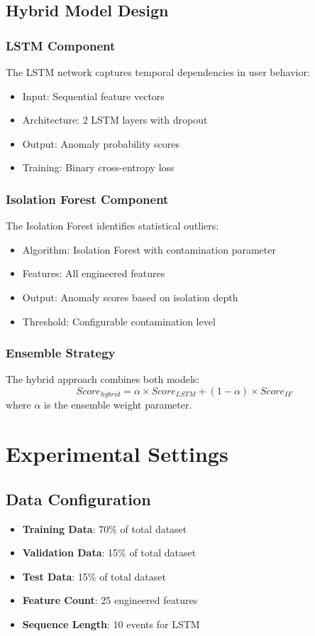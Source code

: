 \documentclass[conference]{IEEEtran}
\begin{document}
\subsection{Hybrid Model Design}
\subsubsection{LSTM Component}
The LSTM network captures temporal dependencies in user behavior:
\begin{itemize}
    \item Input: Sequential feature vectors
    \item Architecture: 2 LSTM layers with dropout
    \item Output: Anomaly probability scores
    \item Training: Binary cross-entropy loss
\end{itemize}

\subsubsection{Isolation Forest Component}
The Isolation Forest identifies statistical outliers:
\begin{itemize}
    \item Algorithm: Isolation Forest with contamination parameter
    \item Features: All engineered features
    \item Output: Anomaly scores based on isolation depth
    \item Threshold: Configurable contamination level
\end{itemize}

\subsubsection{Ensemble Strategy}
The hybrid approach combines both models:
\begin{equation}
Score_{hybrid} = \alpha \times Score_{LSTM} + (1-\alpha) \times Score_{IF}
\end{equation}
where $\alpha$ is the ensemble weight parameter.

\section{Experimental Settings}
\subsection{Data Configuration}
\begin{itemize}
    \item \textbf{Training Data}: 70\% of total dataset
    \item \textbf{Validation Data}: 15\% of total dataset
    \item \textbf{Test Data}: 15\% of total dataset
    \item \textbf{Feature Count}: 25 engineered features
    \item \textbf{Sequence Length}: 10 events for LSTM
\end{itemize}
\end{document}
